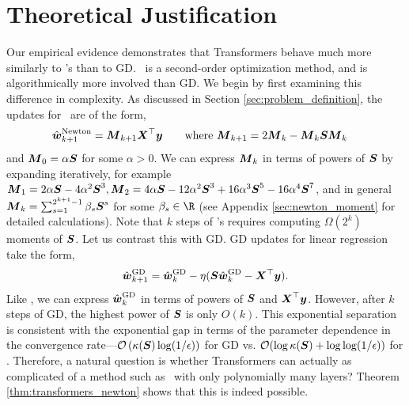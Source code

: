 \vspace{-1mm}
\section{Theoretical Justification}
\label{sec:mechanism}
\vspace{-1mm}

Our empirical evidence demonstrates that Transformers behave much more similarly to \newton's than to GD. \newton\ is a second-order optimization method, and is algorithmically more involved than GD. We begin by first examining this difference in complexity. As discussed in Section \ref{sec:problem_definition}, the updates for \newton\ are of the form,
\begin{align}
   &\hat{\boldsymbol{w}}^\mathrm{Newton}_{k+1} =  \boldsymbol{M}_{k+1}  \boldsymbol{X}^\top \boldsymbol{y}  \qquad \text{where } \boldsymbol{M}_{k+1} = 2 \boldsymbol{M}_{k} - \boldsymbol{M}_k \boldsymbol{S} \boldsymbol{M}_k 
\end{align}
and $\boldsymbol{M}_{0}=\alpha \boldsymbol{S} $ for some $\alpha>0.$ We can express $\boldsymbol{M}_k$ in terms of powers of $\boldsymbol{S}$ by expanding iteratively, for example $\boldsymbol{M}_{1}=2 \alpha \boldsymbol{S} - 4 \alpha^2 \boldsymbol{S}^3, \boldsymbol{M}_{2}= 4 \alpha \boldsymbol{S} - 12 \alpha^2 \boldsymbol{S}^3  + 16 \alpha^3 \boldsymbol{S}^5 - 16\alpha^4 \boldsymbol{S}^7$, and in general $\boldsymbol{M}_k = \sum_{s=1}^{2^{k+1} - 1} \beta_s \boldsymbol{S}^s$ for some $\beta_s\in \R$ (see Appendix \ref{sec:newton_moment} for detailed calculations). Note that $k$ steps of \newton's requires computing $\Omega(2^k)$ moments of $\boldsymbol{S}$. Let us contrast this with GD. GD updates for linear regression take the  form,
\begin{align}
\hat{\boldsymbol{w}}^\mathrm{GD}_{k+1} = \hat{\boldsymbol{w}}^\mathrm{GD}_{k} - \eta (\boldsymbol{S} \hat{\boldsymbol{w}}^\mathrm{GD}_{k} -\boldsymbol{X}^\top \boldsymbol{y}).
\end{align}
Like \newton, we can express $\hat{\boldsymbol{w}}^\mathrm{GD}_{k}$  in terms of powers of $\boldsymbol{S}$ and $\boldsymbol{X}^\top \boldsymbol{y}$. However, after $k$ steps of GD, the highest power of $\boldsymbol{S}$ is only $O(k)$. This exponential separation is consistent with the exponential gap in terms of the parameter dependence in the convergence rate---$\mathcal O\left(\kappa(\boldsymbol{S}) \log(1/\epsilon)\right)$ for GD vs. $\mathcal O(\log \kappa(\boldsymbol{S}) + \log \log (1/\epsilon))$ for \newton. Therefore, a natural question is whether Transformers can actually as complicated of a method such as \newton\ with only polynomially many layers? Theorem \ref{thm:transformers_newton} shows that this is indeed possible. 
    
